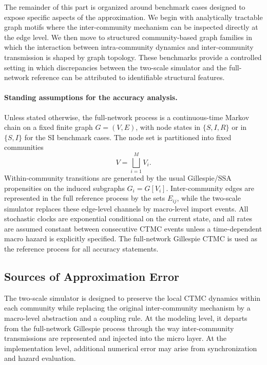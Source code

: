 \documentclass[a4paper,fleqn]{cas-sc}
\newcommand{\ReadStatusTwo}[5]{}
\begin{document}
The remainder of this part is organized around benchmark cases designed to expose specific aspects of the approximation. We begin with analytically tractable graph motifs where the inter-community mechanism can be inspected directly at the edge level. We then move to structured community-based graph families in which the interaction between intra-community dynamics and inter-community transmission is shaped by graph topology. These benchmarks provide a controlled setting in which discrepancies between the two-scale simulator and the full-network reference can be attributed to identifiable structural features.

\paragraph{Standing assumptions for the accuracy analysis.}
Unless stated otherwise, the full-network process is a continuous-time Markov chain on a fixed finite graph \(G=(V,E)\), with node states in \(\{S,I,R\}\) or in \(\{S,I\}\) for the SI benchmark cases. 
The node set is partitioned into fixed communities
\[
V=\bigsqcup_{i=1}^{M}V_i.
\]
Within-community transitions are generated by the usual Gillespie/SSA propensities on the induced subgraphs \(G_i=G[V_i]\). 
Inter-community edges are represented in the full reference process by the sets \(E_{ij}\), while the two-scale simulator replaces these edge-level channels by macro-level import events. 
All stochastic clocks are exponential conditional on the current state, and all rates are assumed constant between consecutive CTMC events unless a time-dependent macro hazard is explicitly specified. 
The full-network Gillespie CTMC is used as the reference process for all accuracy statements.

\subsection{Sources of Approximation Error}
\ReadStatusTwo{Sources of Approximation Error}{Yulian}{1}{Michael}{0}

The two-scale simulator is designed to preserve the local CTMC dynamics within each community while replacing the original inter-community mechanism by a macro-level abstraction and a coupling rule. At the modeling level, it departs from the full-network Gillespie process through the way inter-community transmissions are represented and injected into the micro layer. At the implementation level, additional numerical error may arise from synchronization and hazard evaluation.
\end{document}
